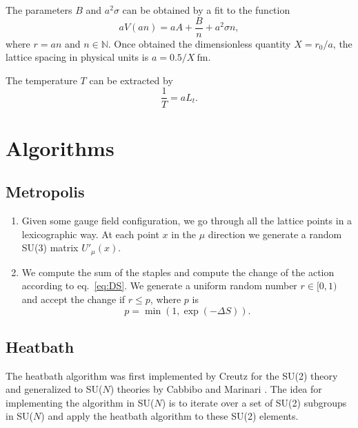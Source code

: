 \documentclass[12pt,a4paper]{article}
\begin{document}
The parameters $B$ and $a^2\sigma$ can be obtained by a fit to the function
\begin{equation}
	aV(an) = aA+\frac{B}{n} + a^2\sigma n,
\end{equation}	
	where $r = a n$ and $n\in \mathbb{N}$.
	Once obtained the dimensionless quantity $X = r_0/a$, the lattice spacing in physical units is $a = 0.5/X \ \text{fm}$.
	
	The temperature $T$ can be extracted by
	\begin{equation}
	\frac{1}{T}= a L_t .
\end{equation}	 
\section{Algorithms}



\subsection{Metropolis}
\begin{enumerate}
	\item Given some gauge field configuration, we go through all the lattice points in a lexicographic way. At each point $x$ in the $\mu$ direction we generate a random SU(3) matrix $U'_{\mu}(x)$.
	
	\item We compute the sum of the staples and compute the change of the action according to eq.\ \eqref{eq:DS}. We generate a uniform random number $r\in [0,1)$ and accept the change if $r \leq p$, where $p$ is
	\begin{equation}
		p = \min (1, \exp(-\Delta S)).
\end{equation}	 
\end{enumerate}

\subsection{Heatbath}
The heatbath algorithm was first implemented by Creutz for the SU(2) theory \cite{creutz1980} and generalized to SU($N$) theories by Cabbibo and Marinari \cite{cabbibo1982}. The idea for implementing the algorithm in SU($N$) is to iterate over a set of SU(2) subgroups in SU($N$) and apply the heatbath algorithm to these SU(2) elements. 
\end{document}
